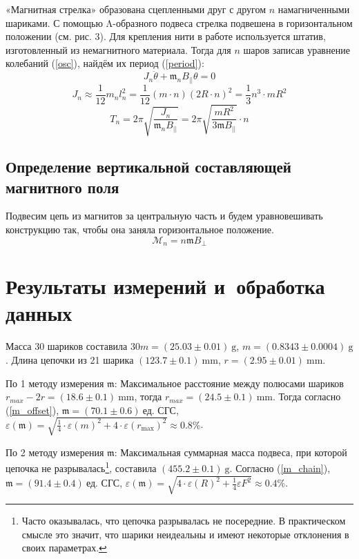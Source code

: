 \documentclass[12pt, a4paper]{article}
\newcommand{\m}{\mathfrak{m}}
\newcommand{\fcgs}{~\text{ед. СГС}}
\begin{document}
«Магнитная стрелка» образована сцеп­ленными друг с другом $n$ намагниченными
шариками. С помощью $\mathrm{\Lambda}$-образного подвеса стрелка подвешена в горизонтальном поло­жении (см. рис. 3). Для крепления нити в работе используется штатив, изготовленный из немагнитного материала.
Тогда для $n$ шаров записав уравнение колебаний (\ref{osc}), найдём их период (\ref{period}):
\begin{equation}
J_n \ddot{\theta} + {\m}_n B_{||}\theta = 0
\label{osc}
\end{equation}
\begin{equation}
J_n \approx \frac{1}{12} m_n l_n^2 =\frac{1}{12} (m\cdot n) (2R\cdot n)^2 = \frac{1}{3} n^3 \cdot mR^2
\end{equation}
\begin{equation}
T_n = 2\pi \sqrt{\dfrac{J_n}{{\m}_n B_{||}}} = 2\pi \sqrt{\dfrac{mR^2}{3\m B_{||}}}\cdot n
\label{period}
\end{equation}

\subsection{Определение вертикальной составляющей магнитного поля}
Подвесим цепь из магнитов за центральную часть и будем уравновешивать конструкцию так, чтобы она заняла горизонтальное положение.
\begin{equation}
\mathcal{M}_n = n \m B_\perp
\label{bperpeq}
\end{equation}
\newpage
\section{Результаты измерений и~обработка данных}
Масса 30 шариков составила $30m = (25.03\pm0.01)~\mathrm{g}$, $m = (0.8343\pm0.0004)~\mathrm{g}$.
Длина цепочки из 21 шарика $(123.7 \pm 0.1)~\mathrm{mm}$, $r = (2.95 \pm 0.01)~\mathrm{mm}$.

По 1 методу измерения $\m$:
Максимальное расстояние между полюсами шариков $r_{max} - 2r = (18.6 \pm 0.1)~\mathrm{mm}$, тогда $r_{max} = (24.5 \pm 0.1)~\mathrm{mm}$. Тогда согласно (\ref{m_offset}), $\m = (70.1\pm0.6) \fcgs$, ${\varepsilon (\m) = \sqrt{\frac{1}{4}\cdot \varepsilon(m)^2 + 4\cdot \varepsilon(r_\text{max})^2} \approx 0.8 \%}$.


По 2 методу измерения $\m$:
Максимальная суммарная масса подвеса, при которой цепочка не разрывалась\footnote{Часто оказывалась, что цепочка разрывалась не посередние. В практическом смысле это значит, что шарики неидеальны и имеют некоторые отклонения в своих параметрах.}, составила $(455.2\pm 0.1)~\mathrm{g}$. Согласно (\ref{m_chain}), $\m = (91.4\pm0.4) \fcgs$, \linebreak${\varepsilon(\m) = \sqrt{4 \cdot \varepsilon(R)^2 + \frac{1}{4} \varepsilon{F}^2} \approx 0.4 \%}$.
\end{document}
